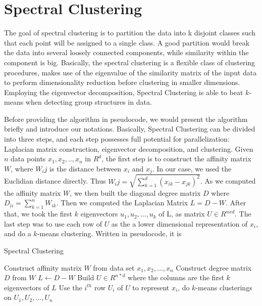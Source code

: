 \documentclass{acm_proc_article-sp}
\begin{document}
\section{Spectral Clustering}
The goal of spectral clustering is to partition the data into k disjoint classes such that each point will be assigned to a single class. A good partition would break the data into several loosely connected components, while similarity within the component is big.
Basically, the spectral clustering is a flexible class of clustering procedures, makes use of the eigenvalue of the similarity matrix of the input data to perform dimensionality reduction before clustering in smaller dimensions. Employing the eigenvector decomposition, Spectral Clustering is able to beat $k$-means when detecting group structures in data.

Before providing the algorithm in pseudocode, we would present the algorithm briefly and introduce our notations. Basically, Spectral Clustering can be divided into three steps, and each step possesses full potential for parallelization: Laplacian matrix construction, eigenvector decomposition, and clustering. Given $n$ data points $x_1, x_2, .., x_n$ in $R^d$, the first step is to construct the affinity matrix $W$, where $W_ij$ is the distance between $x_i$ and $x_j$. In our case, we used the Euclidian distance directly. Thus $W_ij = \sqrt{\sum_{k=1}^d(x_{ik} - x_{jk})^2}$. As we computed the affinity matrix $W$, we then built the diagonal degree matrix $D$ where $D_{ii} = \sum_{k=1}^nW_{ik}$. Then we computed the Laplacian Matrix $L = D - W$. After that, we took the first $k$ eigenvectors $u_1, u_2, …, u_k$ of L, as matrix $U \in R^{nxd}$. The last step was to use each row of $U$ as the a lower dimensional representation of $x_i$, and do a $k$-means clustering. 
Written in pseudocode, it is
\begin{algorithm}
\caption{Spectral Clustering}
\label{CHalgorithm}
\begin{algorithmic}[1]
\State Construct affinity matrix $W$ from data set $x_1, x_2, ..., x_n$
\State Construct degree matrix $D$ from $W$
\State $L \leftarrow D - W$
\State Build $U \in R^{n*d}$ where the columns are the first $k$ eigenvectors of $L$ 
\State Use the $i^{th}$ row $U_i$ of $U$ to represent $x_i$, do $k$-means clusterings on $U_1, U_2, ..., U_n$
\end{algorithmic}
\end{algorithm}
\end{document}
